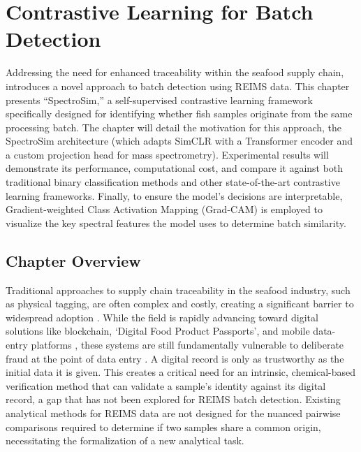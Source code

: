 \chapter{Contrastive Learning for Batch Detection}
\label{chapter:contrastive-learning-for-batch-detection}

Addressing the need for enhanced traceability within the seafood supply chain,  introduces a novel approach to batch detection using REIMS data. This chapter presents “SpectroSim,” a self-supervised contrastive learning framework specifically designed for identifying whether fish samples originate from the same processing batch. The chapter will detail the motivation for this approach, the SpectroSim architecture (which adapts SimCLR with a Transformer encoder and a custom projection head for mass spectrometry). Experimental results will demonstrate its performance, computational cost, and compare it against both traditional binary classification methods and other state-of-the-art contrastive learning frameworks. Finally, to ensure the model's decisions are interpretable, Gradient-weighted Class Activation Mapping (Grad-CAM) is employed to visualize the key spectral features the model uses to determine batch similarity.

\section{Chapter Overview}
\label{sec:introduction}

Traditional approaches to supply chain traceability in the seafood industry, such as physical tagging, are often complex and costly, creating a significant barrier to widespread adoption \citep{Mai2010,Thompson2005}. While the field is rapidly advancing toward digital solutions like blockchain, `Digital Food Product Passports', and mobile data-entry platforms \citep{turkson2025digital, jiang2025traceability, Untal2025, Gastaldi2025}, these systems are still fundamentally vulnerable to deliberate fraud at the point of data entry \citep{Helyar2014}. A digital record is only as trustworthy as the initial data it is given. This creates a critical need for an intrinsic, chemical-based verification method that can validate a sample's identity against its digital record, a gap that has not been explored for REIMS batch detection. Existing analytical methods for REIMS data are not designed for the nuanced pairwise comparisons required to determine if two samples share a common origin, necessitating the formalization of a new analytical task.


